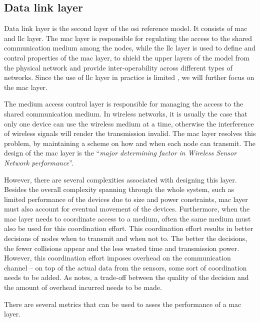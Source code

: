 \subsection{Data link layer}
Data link layer is the second layer of the \acrshort{osi} reference model. It consists of \acrfull{mac} and \acrfull{llc} layer. The \acrshort{mac} layer is responsible for regulating the access to the shared communication medium among the nodes, while the \acrshort{llc} layer is used to define and control properties of the \acrshort{mac} layer, to shield the upper layers of the model from the physical network and provide inter-operability  across different types of networks. Since the use of \acrshort{llc} layer in practice is limited \cite{Sohraby2007WirelessApplications}, we will further focus on the \acrshort{mac} layer.

The medium access control layer is responsible for managing the access to the shared communication medium. In wireless networks, it is usually the case that only one device can use the wireless medium at a time, otherwise the interference of wireless signals will render the transmission invalid. The \acrshort{mac} layer resolves this problem, by maintaining a scheme on how and when each node can transmit. The design of the \acrshort{mac} layer is the ``\textit{major determining factor in Wireless Sensor Network performance}''\cite{Sohraby2007WirelessApplications}. 

However, there are several complexities associated with designing this layer. Besides the overall complexity spanning through the whole system, such as limited performance of the devices due to size and power constraints, \acrshort{mac} layer must also account for eventual movement of the devices. Furthermore, when the \acrshort{mac} layer needs to coordinate access to a medium, often the same medium must also be used for this coordination effort. This coordination effort results in better decisions of nodes when to transmit and when not to. The better the decisions, the fewer collisions appear and the less wasted time and transmission power. However, this coordination effort imposes overhead on the communication channel -- on top of the actual data from the sensors, some sort of coordination needs to be added. As \cite{Sohraby2007WirelessApplications} notes, a trade-off between the quality of the decision and the amount of overhead incurred needs to be made.

There are several metrics that can be used to asses the performance of a \acrshort{mac} layer. 

